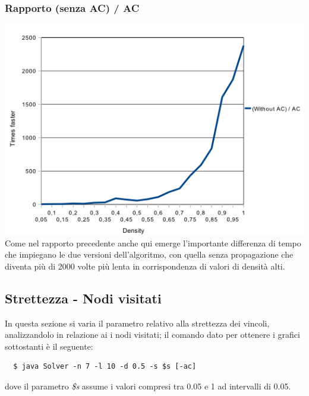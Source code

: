 \documentclass[a4paper,12pt,italian]{article}
\begin{document}
\subsubsection{Rapporto (senza AC) / AC}
\includegraphics[scale=0.8]{densTimeQuotient.png}
\\
Come nel rapporto precedente anche qui emerge l'importante differenza di tempo che impiegano le
due versioni dell'algoritmo, con quella senza propagazione che diventa pi\`u di 2000 volte pi\`u lenta
in corrispondenza di valori di densit\`a alti.

\subsection{Strettezza - Nodi visitati}
In questa sezione si varia il parametro relativo alla strettezza dei vincoli, analizzandolo
in relazione ai i nodi visitati; il comando dato per ottenere i grafici sottostanti
\`e il seguente:
\begin{verbatim}
  $ java Solver -n 7 -l 10 -d 0.5 -s $s [-ac]
\end{verbatim}
dove il parametro \textit{\$s} assume i valori compresi tra 0.05 e 1 ad intervalli di 0.05.
\end{document}
